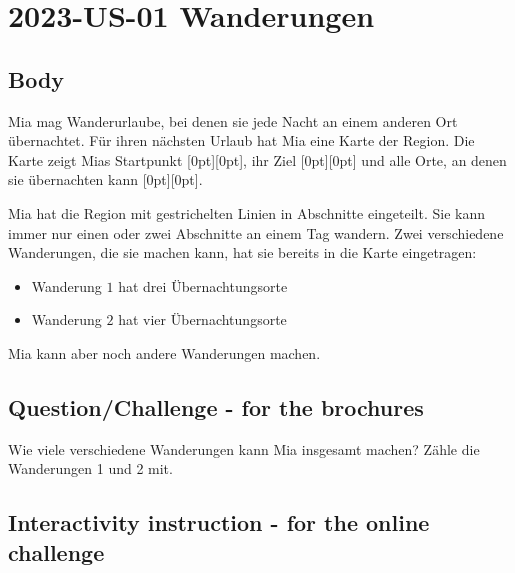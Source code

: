 \documentclass[a4paper,11pt]{report}
\newcommand{\taskGraphicsFolder}{..}
\begin{document}
\section*{\centering{} 2023-US-01 Wanderungen}


\subsection*{Body}

Mia mag Wanderurlaube, bei denen sie jede Nacht an einem anderen Ort übernachtet. Für ihren nächsten Urlaub hat Mia eine Karte der Region.
Die Karte zeigt Mias Startpunkt \raisebox{-0.5ex}[0pt][0pt]{}, ihr Ziel \raisebox{-0.5ex}[0pt][0pt]{} und alle Orte, an denen sie übernachten kann \raisebox{-0.5ex}[0pt][0pt]{}.

{\centering%
\par}

Mia hat die Region mit gestrichelten Linien in Abschnitte eingeteilt. Sie kann immer nur einen oder zwei Abschnitte an einem Tag wandern.
Zwei verschiedene Wanderungen, die sie machen kann, hat sie bereits in die Karte eingetragen:

\begin{itemize}
  \item Wanderung $1$ hat drei Übernachtungsorte
  \item Wanderung $2$ hat vier Übernachtungsorte
\end{itemize}

Mia kann aber noch andere Wanderungen machen.

{\em


\subsection*{Question/Challenge - for the brochures}

Wie viele verschiedene Wanderungen kann Mia insgesamt machen?
Zähle die Wanderungen 1 und 2 mit.

}


\subsection*{Interactivity instruction - for the online challenge}
\end{document}
